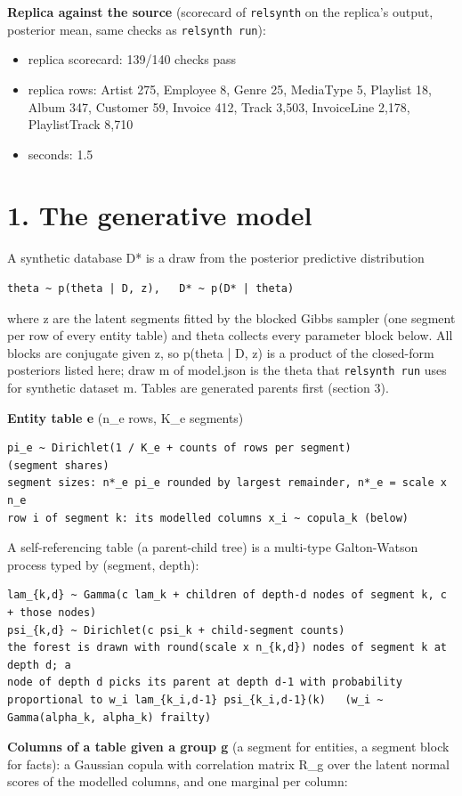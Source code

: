 \documentclass[10pt]{article}
\begin{document}
\textbf{Replica against the source} (scorecard of \texttt{relsynth} on the replica's output, posterior mean, same checks as \texttt{relsynth run}):

\begin{itemize}
\item replica scorecard: 139/140 checks pass
\item replica rows: Artist 275, Employee 8, Genre 25, MediaType 5, Playlist 18, Album 347, Customer 59, Invoice 412, Track 3,503, InvoiceLine 2,178, PlaylistTrack 8,710
\item seconds: 1.5
\end{itemize}

\section*{1. The generative model}

A synthetic database D* is a draw from the posterior predictive distribution

\begin{verbatim}
theta ~ p(theta | D, z),   D* ~ p(D* | theta)
\end{verbatim}
where z are the latent segments fitted by the blocked Gibbs sampler (one segment per
row of every entity table) and theta collects every parameter block below.  All
blocks are conjugate given z, so p(theta | D, z) is a product of the closed-form
posteriors listed here; draw m of model.json is the theta that \texttt{relsynth run} uses
for synthetic dataset m.  Tables are generated parents first (section 3).

\textbf{Entity table e} (n\_e rows, K\_e segments)

\begin{verbatim}
pi_e ~ Dirichlet(1 / K_e + counts of rows per segment)               (segment shares)
segment sizes: n*_e pi_e rounded by largest remainder, n*_e = scale x n_e
row i of segment k: its modelled columns x_i ~ copula_k (below)
\end{verbatim}
A self-referencing table (a parent-child tree) is a multi-type Galton-Watson
process typed by (segment, depth):

\begin{verbatim}
lam_{k,d} ~ Gamma(c lam_k + children of depth-d nodes of segment k, c + those nodes)
psi_{k,d} ~ Dirichlet(c psi_k + child-segment counts)
the forest is drawn with round(scale x n_{k,d}) nodes of segment k at depth d; a
node of depth d picks its parent at depth d-1 with probability
proportional to w_i lam_{k_i,d-1} psi_{k_i,d-1}(k)   (w_i ~ Gamma(alpha_k, alpha_k) frailty)
\end{verbatim}
\textbf{Columns of a table given a group g} (a segment for entities, a segment block
for facts): a Gaussian copula with correlation matrix R\_g over the latent
normal scores of the modelled columns, and one marginal per column:
\end{document}
